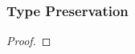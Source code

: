 \documentclass[conference]{IEEEtran}
\begin{document}
\subsubsection{Type Preservation}
\begin{proof}
	
\end{proof}
\end{document}
